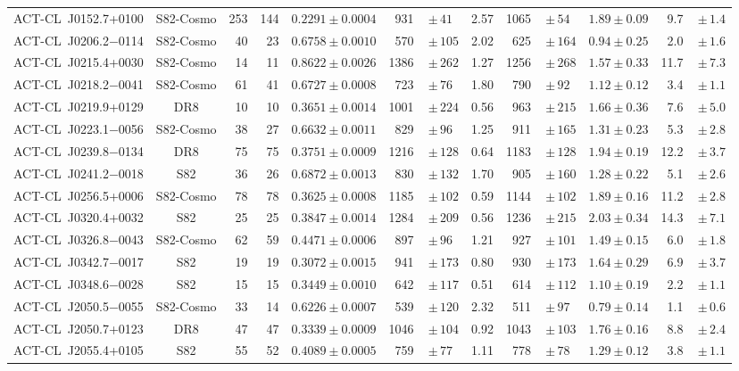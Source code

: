 {\begin{landscape}
\begin{table}
\begin{tabular}{l c r r c r@{}l c r@{}l c r@{}l}
ACT-CL~J0152.7+0100 & S82-Cosmo & 253 & 144 & $0.2291\pm0.0004$ & 931\, & $\pm\,41$ & 2.57 & 
1065\, & $\pm\,54$ & $1.89\pm0.09$ & 9.7\, & $\pm\,1.4$ \\
ACT-CL~J0206.2$-$0114 & S82-Cosmo & 40 & 23 & $0.6758\pm0.0010$ & 570\, & $\pm\,105$ & 2.02 & 
625\, & $\pm\,164$ & $0.94\pm0.25$ & 2.0\, & $\pm\,1.6$ \\
ACT-CL~J0215.4+0030 & S82-Cosmo & 14 & 11 & $0.8622\pm0.0026$ & 1386\, & $\pm\,262$ & 1.27 & 
1256\, & $\pm\,268$ & $1.57\pm0.33$ & 11.7\, & $\pm\,7.3$ \\
ACT-CL~J0218.2$-$0041 & S82-Cosmo & 61 & 41 & $0.6727\pm0.0008$ & 723\, & $\pm\,76$ & 1.80 & 790\, 
& $\pm\,92$ & $1.12\pm0.12$ & 3.4\, & $\pm\,1.1$ \\
ACT-CL~J0219.9+0129 & DR8 & 10 & 10 & $0.3651\pm0.0014$ & 1001\, & $\pm\,224$ & 0.56 & 963\, & 
$\pm\,215$ & $1.66\pm0.36$ & 7.6\, & $\pm\,5.0$ \\
ACT-CL~J0223.1$-$0056 & S82-Cosmo & 38 & 27 & $0.6632\pm0.0011$ & 829\, & $\pm\,96$ & 1.25 & 911\, 
& $\pm\,165$ & $1.31\pm0.23$ & 5.3\, & $\pm\,2.8$ \\
ACT-CL~J0239.8$-$0134 & DR8 & 75 & 75 & $0.3751\pm0.0009$ & 1216\, & $\pm\,128$ & 0.64 & 1183\, & 
$\pm\,128$ & $1.94\pm0.19$ & 12.2\, & $\pm\,3.7$ \\
ACT-CL~J0241.2$-$0018 & S82 & 36 & 26 & $0.6872\pm0.0013$ & 830\, & $\pm\,132$ & 1.70 & 905\, & 
$\pm\,160$ & $1.28\pm0.22$ & 5.1\, & $\pm\,2.6$ \\
ACT-CL~J0256.5+0006 & S82-Cosmo & 78 & 78 & $0.3625\pm0.0008$ & 1185\, & $\pm\,102$ & 0.59 & 
1144\, & $\pm\,102$ & $1.89\pm0.16$ & 11.2\, & $\pm\,2.8$ \\
ACT-CL~J0320.4+0032 & S82 & 25 & 25 & $0.3847\pm0.0014$ & 1284\, & $\pm\,209$ & 0.56 & 1236\, & 
$\pm\,215$ & $2.03\pm0.34$ & 14.3\, & $\pm\,7.1$ \\
ACT-CL~J0326.8$-$0043 & S82-Cosmo & 62 & 59 & $0.4471\pm0.0006$ & 897\, & $\pm\,96$ & 1.21 & 927\, 
& $\pm\,101$ & $1.49\pm0.15$ & 6.0\, & $\pm\,1.8$ \\
ACT-CL~J0342.7$-$0017 & S82 & 19 & 19 & $0.3072\pm0.0015$ & 941\, & $\pm\,173$ & 0.80 & 930\, & 
$\pm\,173$ & $1.64\pm0.29$ & 6.9\, & $\pm\,3.7$ \\
ACT-CL~J0348.6$-$0028 & S82 & 15 & 15 & $0.3449\pm0.0010$ & 642\, & $\pm\,117$ & 0.51 & 614\, & 
$\pm\,112$ & $1.10\pm0.19$ & 2.2\, & $\pm\,1.1$ \\
ACT-CL~J2050.5$-$0055 & S82-Cosmo & 33 & 14 & $0.6226\pm0.0007$ & 539\, & $\pm\,120$ & 2.32 & 
511\, & $\pm\,97$ & $0.79\pm0.14$ & 1.1\, & $\pm\,0.6$ \\
ACT-CL~J2050.7+0123 & DR8 & 47 & 47 & $0.3339\pm0.0009$ & 1046\, & $\pm\,104$ & 0.92 & 1043\, & 
$\pm\,103$ & $1.76\pm0.16$ & 8.8\, & $\pm\,2.4$ \\
ACT-CL~J2055.4+0105 & S82 & 55 & 52 & $0.4089\pm0.0005$ & 759\, & $\pm\,77$ & 1.11 & 778\, & 
$\pm\,78$ & $1.29\pm0.12$ & 3.8\, & $\pm\,1.1$ \\
\hline
\end{tabular}
\end{table}


\end{landscape}}
